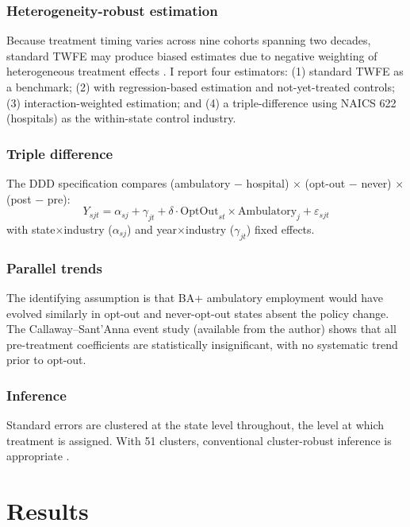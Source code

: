 \documentclass[12pt]{article}
\begin{document}
\subsubsection*{Heterogeneity-robust estimation} Because treatment timing varies across nine cohorts spanning two decades, standard TWFE may produce biased estimates due to negative weighting of heterogeneous treatment effects \citep{goodman2021difference, de2020two}. I report four estimators: (1) standard TWFE as a benchmark; (2) \citet{callaway2021difference} with regression-based estimation and not-yet-treated controls; (3) \citet{sun2021estimating} interaction-weighted estimation; and (4) a triple-difference using NAICS 622 (hospitals) as the within-state control industry.

\subsubsection*{Triple difference} The DDD specification compares (ambulatory $-$ hospital) $\times$ (opt-out $-$ never) $\times$ (post $-$ pre):
\begin{equation}
Y_{sjt} = \alpha_{sj} + \gamma_{jt} + \delta \cdot \text{OptOut}_{st} \times \text{Ambulatory}_j + \varepsilon_{sjt}
\end{equation}
with state$\times$industry ($\alpha_{sj}$) and year$\times$industry ($\gamma_{jt}$) fixed effects.

\subsubsection*{Parallel trends} The identifying assumption is that BA+ ambulatory employment would have evolved similarly in opt-out and never-opt-out states absent the policy change. The Callaway--Sant'Anna event study (available from the author) shows that all pre-treatment coefficients are statistically insignificant, with no systematic trend prior to opt-out.

\subsubsection*{Inference} Standard errors are clustered at the state level throughout, the level at which treatment is assigned. With 51 clusters, conventional cluster-robust inference is appropriate \citep{cameron2015practitioners}.


\section{Results}
\end{document}
